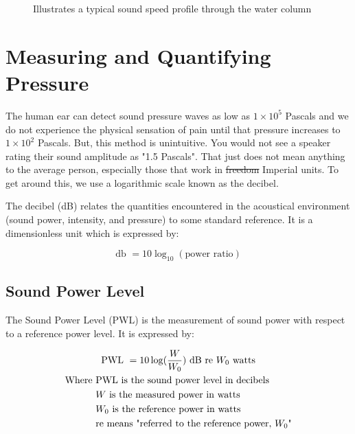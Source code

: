 \begin{figure}
    \caption{Illustrates a typical sound speed profile through the water column}
\end{figure}

\section{Measuring and Quantifying Pressure}
The human ear can detect sound pressure waves as low as $1 \times 10^5$ Pascals and we do not experience the physical sensation of pain until that pressure increases to $1 \times 10^2$ Pascals.
But, this method is unintuitive.
You would not see a speaker rating their sound amplitude as "1.5 Pascals". 
That just does not mean anything to the average person, especially those that work in \st{freedom} Imperial units. 
To get around this, we use a logarithmic scale known as the decibel.

The decibel (dB) relates the quantities encountered in the acoustical environment (sound power, intensity, and pressure) to some standard reference.
It is a dimensionless unit which is expressed by:

\begin{equation*}
    \text{db } = 10 \log_{10}(\text{power ratio})
\end{equation*}

    \subsection{Sound Power Level}
    The Sound Power Level (PWL) is the measurement of sound power with respect to a reference power level.
    It is expressed by:

    \begin{gather} \labeq{pwl}
        \text{PWL } = 10 \log(\frac{W}{W_0}) \text{ dB re $W_0$ watts} \\
        \begin{aligned}
            \text{Where }   & \text{PWL is the sound power level in decibels} \\
                            &W \text{ is the measured power in watts} \\
                            &W_0 \text{ is the reference power in watts} \\
                            & \text{re means "referred to the reference power, $W_0$"} \\
        \end{aligned} \notag
    \end{gather}

